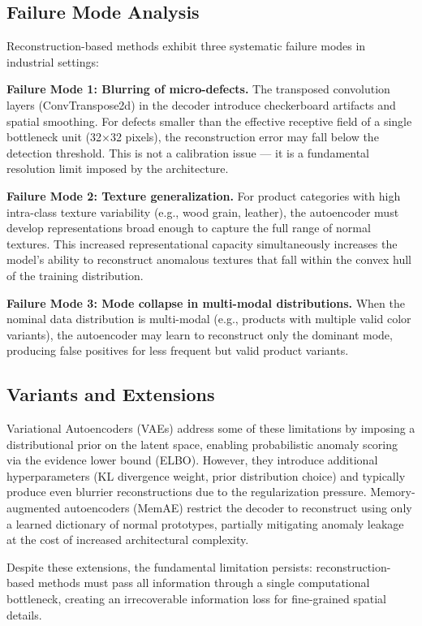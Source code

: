 \documentclass[12pt,a4paper,oneside]{report}
\begin{document}
\subsection{Failure Mode Analysis}

Reconstruction-based methods exhibit three systematic failure modes in industrial settings:

\textbf{Failure Mode 1: Blurring of micro-defects.} The transposed convolution layers (ConvTranspose2d) in the decoder introduce checkerboard artifacts and spatial smoothing. For defects smaller than the effective receptive field of a single bottleneck unit (32×32 pixels), the reconstruction error may fall below the detection threshold. This is not a calibration issue --- it is a fundamental resolution limit imposed by the architecture.

\textbf{Failure Mode 2: Texture generalization.} For product categories with high intra-class texture variability (e.g., wood grain, leather), the autoencoder must develop representations broad enough to capture the full range of normal textures. This increased representational capacity simultaneously increases the model's ability to reconstruct anomalous textures that fall within the convex hull of the training distribution.

\textbf{Failure Mode 3: Mode collapse in multi-modal distributions.} When the nominal data distribution is multi-modal (e.g., products with multiple valid color variants), the autoencoder may learn to reconstruct only the dominant mode, producing false positives for less frequent but valid product variants.

\subsection{Variants and Extensions}

Variational Autoencoders (VAEs) address some of these limitations by imposing a distributional prior on the latent space, enabling probabilistic anomaly scoring via the evidence lower bound (ELBO). However, they introduce additional hyperparameters (KL divergence weight, prior distribution choice) and typically produce even blurrier reconstructions due to the regularization pressure. Memory-augmented autoencoders (MemAE) restrict the decoder to reconstruct using only a learned dictionary of normal prototypes, partially mitigating anomaly leakage at the cost of increased architectural complexity.

Despite these extensions, the fundamental limitation persists: reconstruction-based methods must pass all information through a single computational bottleneck, creating an irrecoverable information loss for fine-grained spatial details.
\end{document}
